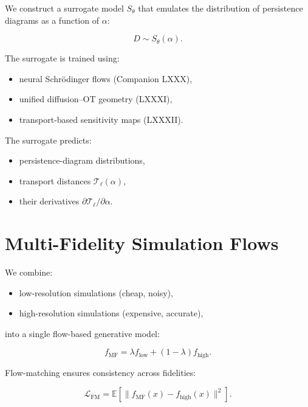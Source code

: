 \documentclass[11pt,a4paper]{article}
\begin{document}
We construct a surrogate model $S_{\theta}$ that emulates the distribution of 
persistence diagrams as a function of $\alpha$:



\[
    D \sim S_{\theta}(\alpha).
\]



The surrogate is trained using:

\begin{itemize}
    \item neural Schrödinger flows (Companion LXXX),
    \item unified diffusion--OT geometry (LXXXI),
    \item transport-based sensitivity maps (LXXXII).
\end{itemize}

The surrogate predicts:

\begin{itemize}
    \item persistence-diagram distributions,
    \item transport distances $\mathcal{T}_{\ell}(\alpha)$,
    \item their derivatives $\partial \mathcal{T}_{\ell}/\partial \alpha$.
\end{itemize}
\section{Multi-Fidelity Simulation Flows}

We combine:

\begin{itemize}
    \item low-resolution simulations (cheap, noisy),
    \item high-resolution simulations (expensive, accurate),
\end{itemize}

into a single flow-based generative model:



\[
    f_{\mathrm{MF}} = \lambda f_{\mathrm{low}} + (1-\lambda) f_{\mathrm{high}}.
\]



Flow-matching ensures consistency across fidelities:



\[
    \mathcal{L}_{\mathrm{FM}}
    =
    \mathbb{E}
    \left[
        \| f_{\mathrm{MF}}(x) - f_{\mathrm{high}}(x) \|^{2}
    \right].
\]
\end{document}

